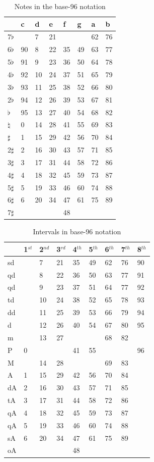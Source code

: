 \documentclass{article}
\begin{document}
\begin{table}
  \centering
  \begin{tabular}{l|lllllll}
               & c & d& e& f& g& a& b \\
    \hline
    7$\flat$   &   & 7&21&  &  &62&76 \\
    6$\flat$   & 90& 8&22&35&49&63&77 \\
    5$\flat$   & 91& 9&23&36&50&64&78 \\
    4$\flat$   & 92&10&24&37&51&65&79 \\
    3$\flat$   & 93&11&25&38&52&66&80 \\
    2$\flat$   & 94&12&26&39&53&67&81 \\
    $\flat$    & 95&13&27&40&54&68&82 \\
    $\natural$ &  0&14&28&41&55&69&83 \\
    $\sharp$   &  1&15&29&42&56&70&84 \\
    2$\sharp$  &  2&16&30&43&57&71&85 \\
    3$\sharp$  &  3&17&31&44&58&72&86 \\
    4$\sharp$  &  4&18&32&45&59&73&87 \\
    5$\sharp$  &  5&19&33&46&60&74&88 \\
    6$\sharp$  &  6&20&34&47&61&75&89 \\
    7$\sharp$  &   &  &  &48&  &  &   \\
  \end{tabular}
  \caption{Notes in the base-96 notation}
  \label{tab:jama-notas}
\end{table}

\begin{table}
  \centering
  \begin{tabular}{l|llllllll}
    & 1$^{st}$& 2$^{nd}$& 3$^{rd}$& 4$^{th}$& 5$^{th}$& 6$^{th}$& 7$^{th}$& 8$^{th}$ \\
    \hline
    sd  &  & 7&21&35&49&62&76&90 \\
    qd  &  & 8&22&36&50&63&77&91 \\
    qd  &  & 9&23&37&51&64&77&92 \\
    td  &  &10&24&38&52&65&78&93 \\
    dd  &  &11&25&39&53&66&79&94 \\
    d   &  &12&26&40&54&67&80&95 \\
    m   &  &13&27&  &  &68&82&   \\
    P   & 0&  &  &41&55&  &  &96 \\
    M   &  &14&28&  &  &69&83&   \\
    A   & 1&15&29&42&56&70&84&   \\
    dA  & 2&16&30&43&57&71&85&   \\
    tA  & 3&17&31&44&58&72&86&   \\
    qA  & 4&18&32&45&59&73&87&   \\
    qA  & 5&19&33&46&60&74&88&   \\
    sA  & 6&20&34&47&61&75&89&   \\
    oA  &  &  &  &48&  &  &  &   
  \end{tabular}
  \caption{Intervals in base-96 notation}
  \label{tab:jama-intervalos}
\end{table}
\end{document}
